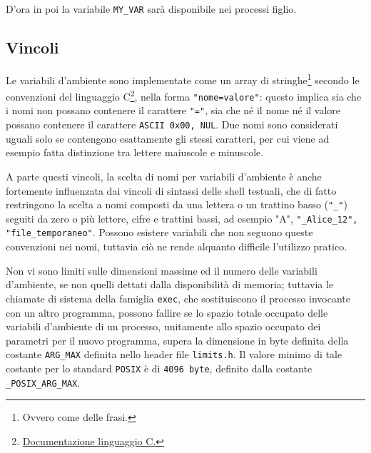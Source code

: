 D'ora in poi la variabile \verb*|MY_VAR| sarà disponibile nei processi figlio. 
\subsection{Vincoli}
Le variabili d'ambiente sono implementate come un array di stringhe\footnote{Ovvero come delle frasi.} secondo le convenzioni del linguaggio C\footnote{\hyperref{https://en.cppreference.com/w/c/language}{docu}{C}{Documentazione linguaggio C.}}, nella forma \verb*|"nome=valore"|: questo implica sia che i nomi non possano contenere il carattere \verb*|"="|, sia che né il nome né il valore possano contenere il carattere \verb*|ASCII 0x00, NUL|. Due nomi sono considerati uguali solo se contengono esattamente gli stessi caratteri, per cui viene ad esempio fatta distinzione tra lettere maiuscole e minuscole.

A parte questi vincoli, la scelta di nomi per variabili d'ambiente è anche fortemente influenzata dai vincoli di sintassi delle shell testuali, che di fatto restringono la scelta a nomi composti da una lettera o un trattino basso (\verb*|"_"|) seguiti da zero o più lettere, cifre e trattini bassi, ad esempio "A", \verb*|"_Alice_12", "file_temporaneo"|. Possono esistere variabili che non seguono queste convenzioni nei nomi, tuttavia ciò ne rende alquanto difficile l'utilizzo pratico.

Non vi sono limiti sulle dimensioni massime ed il numero delle variabili d'ambiente, se non quelli dettati dalla disponibilità di memoria; tuttavia le chiamate di sistema della famiglia \verb*|exec|, che sostituiscono il processo invocante con un altro programma, possono fallire se lo spazio totale occupato delle variabili d'ambiente di un processo, unitamente allo spazio occupato dei parametri per il nuovo programma, supera la dimensione in byte definita della costante \verb*|ARG_MAX| definita nello header file \verb*|limits.h|. Il valore minimo di tale costante per lo standard \verb*|POSIX| è di \verb*|4096 byte|, definito dalla costante \verb*|_POSIX_ARG_MAX|.
